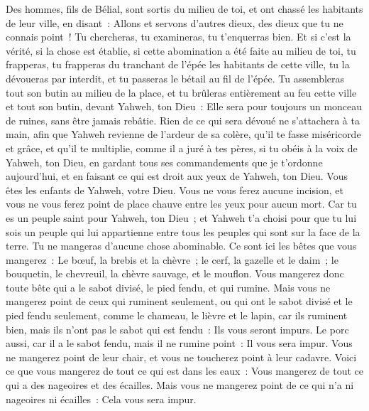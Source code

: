 \begin{multicols}{2}
Des hommes, fils de Bélial, sont sortis du milieu de toi, et ont chassé les habitants de leur ville, en disant~: Allons et servons d'autres dieux, des dieux que tu ne connais point~!
Tu chercheras, tu examineras, tu t'enquerras bien. Et si c'est la vérité, si la chose est établie, si cette abomination a été faite au milieu de toi,
tu frapperas, tu frapperas du tranchant de l'épée les habitants de cette ville, tu la dévoueras par interdit, et tu passeras le bétail au fil de l'épée.
Tu assembleras tout son butin au milieu de la place, et tu brûleras entièrement au feu cette ville et tout son butin, devant Yahweh, ton Dieu~: Elle sera pour toujours un monceau de ruines, sans être jamais rebâtie.
Rien de ce qui sera dévoué ne s'attachera à ta main, afin que Yahweh revienne de l'ardeur de sa colère, qu'il te fasse miséricorde et grâce, et qu'il te multiplie, comme il a juré à tes pères,
si tu obéis à la voix de Yahweh, ton Dieu, en gardant tous ses commandements que je t'ordonne aujourd'hui, et en faisant ce qui est droit aux yeux de Yahweh, ton Dieu.
\VerseOne{}Vous êtes les enfants de Yahweh, votre Dieu. Vous ne vous ferez aucune incision, et vous ne vous ferez point de place chauve entre les yeux pour aucun mort.
Car tu es un peuple saint pour Yahweh, ton Dieu~; et Yahweh t'a choisi pour que tu lui sois un peuple qui lui appartienne entre tous les peuples qui sont sur la face de la terre.
Tu ne mangeras d'aucune chose abominable.
Ce sont ici les bêtes que vous mangerez~: Le bœuf, la brebis et la chèvre~;
le cerf, la gazelle et le daim~; le bouquetin, le chevreuil, la chèvre sauvage, et le mouflon.
Vous mangerez donc toute bête qui a le sabot divisé, le pied fendu, et qui rumine.
Mais vous ne mangerez point de ceux qui ruminent seulement, ou qui ont le sabot divisé et le pied fendu seulement, comme le chameau, le lièvre et le lapin, car ils ruminent bien, mais ils n'ont pas le sabot qui est fendu~: Ils vous seront impurs.
Le porc aussi, car il a le sabot fendu, mais il ne rumine point~: Il vous sera impur. Vous ne mangerez point de leur chair, et vous ne toucherez point à leur cadavre.
Voici ce que vous mangerez de tout ce qui est dans les eaux~: Vous mangerez de tout ce qui a des nageoires et des écailles.
Mais vous ne mangerez point de ce qui n'a ni nageoires ni écailles~: Cela vous sera impur.

\end{multicols}
